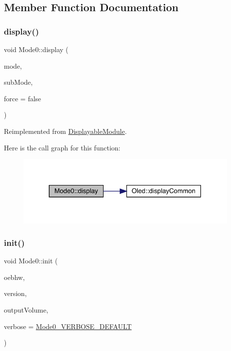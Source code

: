 \subsection{Member Function Documentation}
\mbox{\label{class_mode0_a7d43e749cfd1831974f36d7d8e54e221}} 
\subsubsection{\texorpdfstring{display()}{display()}}
{\footnotesize\ttfamily void Mode0\+::display (\begin{DoxyParamCaption}\item[{int}]{mode,  }\item[{int}]{sub\+Mode,  }\item[{bool}]{force = {\ttfamily false} }\end{DoxyParamCaption})\hspace{0.3cm}{\ttfamily [virtual]}}



Reimplemented from \mbox{\hyperlink{class_displayable_module_a02de26d62ef508cae9ed07920e21784d}{Displayable\+Module}}.

Here is the call graph for this function\+:\nopagebreak
\begin{figure}[H]
\begin{center}
\leavevmode
\includegraphics[width=314pt]{class_mode0_a7d43e749cfd1831974f36d7d8e54e221_cgraph}
\end{center}
\end{figure}
\mbox{\label{class_mode0_a21802f200c6e3792ca5f8daf91ce910c}} 
\subsubsection{\texorpdfstring{init()}{init()}}
{\footnotesize\ttfamily void Mode0\+::init (\begin{DoxyParamCaption}\item[{\mbox{\hyperlink{class_open_effects_box_h_w}{Open\+Effects\+Box\+HW}} $\ast$}]{oebhw,  }\item[{char $\ast$}]{version,  }\item[{float $\ast$}]{output\+Volume,  }\item[{int}]{verbose = {\ttfamily \mbox{\hyperlink{_mode0_8h_a1851011771f1e9b90e1ea5dada4cd724}{Mode0\+\_\+\+V\+E\+R\+B\+O\+S\+E\+\_\+\+D\+E\+F\+A\+U\+LT}}} }\end{DoxyParamCaption})}

